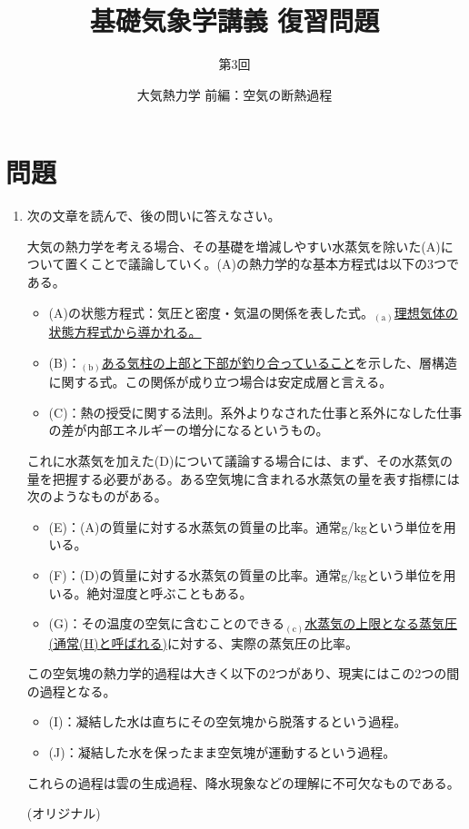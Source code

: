 \documentclass{jsarticle}
\newenvironment{problems}
{
  \renewcommand\labelenumi{\doublebox{\arabic{enumi}}}
  \begin{enumerate}
}{
  \end{enumerate}
  \renewcommand\labelenumi{\arabic{enumi}.}
}
\begin{document}
\title{基礎気象学講義 復習問題} %
\author{第3回} %
\date{大気熱力学 前編：空気の断熱過程} %
\maketitle

\section{問題}

    \begin{problems}
    \item 次の文章を読んで、後の問いに答えなさい。
        \begin{screen}
          大気の熱力学を考える場合、その基礎を増減しやすい水蒸気を除いた(A)について置くことで議論していく。(A)の熱力学的な基本方程式は以下の3つである。
          \begin{itemize}
          \item (A)の状態方程式：気圧と密度・気温の関係を表した式。$_{(\mathrm{a})}$\underline{理想気体の状態方程式から導かれる。}
          \item (B)：$_{(\mathrm{b})}$\underline{ある気柱の上部と下部が釣り合っていること}を示した、層構造に関する式。この関係が成り立つ場合は安定成層と言える。
          \item (C)：熱の授受に関する法則。系外よりなされた仕事と系外になした仕事の差が内部エネルギーの増分になるというもの。
          \end{itemize}
          これに水蒸気を加えた(D)について議論する場合には、まず、その水蒸気の量を把握する必要がある。ある空気塊に含まれる水蒸気の量を表す指標には次のようなものがある。
          \begin{itemize}
          \item (E)：(A)の質量に対する水蒸気の質量の比率。通常g/kgという単位を用いる。
          \item (F)：(D)の質量に対する水蒸気の質量の比率。通常g/kgという単位を用いる。絶対湿度と呼ぶこともある。
          \item (G)：その温度の空気に含むことのできる$_{(\mathrm{c})}$\underline{水蒸気の上限となる蒸気圧(通常(H)と呼ばれる)}に対する、実際の蒸気圧の比率。
          \end{itemize}
          この空気塊の熱力学的過程は大きく以下の2つがあり、現実にはこの2つの間の過程となる。
          \begin{itemize}
          \item (I)：凝結した水は直ちにその空気塊から脱落するという過程。
          \item (J)：凝結した水を保ったまま空気塊が運動するという過程。
          \end{itemize}
          これらの過程は雲の生成過程、降水現象などの理解に不可欠なものである。
            \begin{flushright}
            (オリジナル)
            \end{flushright}
        \end{screen}


\end{problems}
\end{document}
